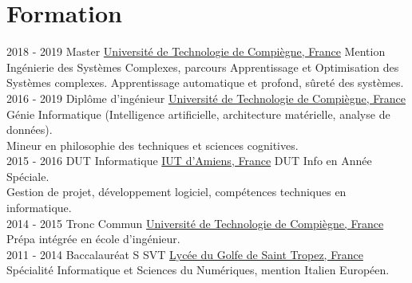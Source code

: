 \documentclass[letterpaper]{twentysecondcv} %
\begin{document}
\makeprofile %


\section{Formation}

\begin{twenty} %
	\twentyitem
    	{2018 - 2019}
        {}
        {Master}
        {\href{https://www.utc.fr/}{Université de Technologie de Compiègne, France}}
        {}
        {Mention Ingénierie des Systèmes Complexes, parcours Apprentissage et Optimisation des Systèmes complexes. Apprentissage automatique et profond, sûreté des systèmes.}
    \\
	\twentyitem
    	{2016 - 2019}
        {}
        {Diplôme d'ingénieur}
        {\href{https://www.utc.fr/}{Université de Technologie de Compiègne, France}}
        {}
        {Génie Informatique (Intelligence artificielle, architecture matérielle, analyse de données).\\Mineur en philosophie des techniques et sciences cognitives.}
    \\
	\twentyitem
    	{2015 - 2016}
        {}
        {DUT Informatique}
        {\href{http://www.iut-amiens.fr/}{IUT d'Amiens, France}}
        {}
        {DUT Info en Année Spéciale.\\Gestion de projet, développement logiciel, compétences techniques en informatique.}
    \\
	\twentyitem
    	{2014 - 2015}
        {}
        {Tronc Commun}
        {\href{https://www.utc.fr/}{Université de Technologie de Compiègne, France}}
        {}
        {Prépa intégrée en école d'ingénieur.}
    \\
	\twentyitem
    	{2011 - 2014}
		{}
        {Baccalauréat S SVT}
        {\href{http://www.lyc-du-golfe-de-saint-tropez.ac-nice.fr/}{Lycée du Golfe de Saint Tropez, France}}
        {}
        {Spécialité Informatique et Sciences du Numériques, mention Italien Européen.}
\end{twenty}

\end{document}
